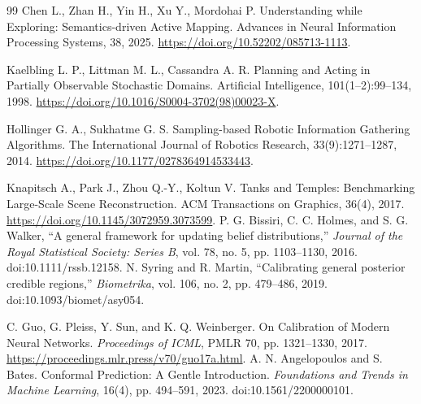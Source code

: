 \documentclass[11pt,a4paper]{article}
\begin{document}
\begin{thebibliography}{99}
 Chen L., Zhan H., Yin H., Xu Y., Mordohai P. Understanding while Exploring: Semantics-driven Active Mapping. Advances in Neural Information Processing Systems, 38, 2025. \url{https://doi.org/10.52202/085713-1113}.

 Kaelbling L. P., Littman M. L., Cassandra A. R. Planning and Acting in Partially Observable Stochastic Domains. Artificial Intelligence, 101(1--2):99--134, 1998. \url{https://doi.org/10.1016/S0004-3702(98)00023-X}.

 Hollinger G. A., Sukhatme G. S. Sampling-based Robotic Information Gathering Algorithms. The International Journal of Robotics Research, 33(9):1271--1287, 2014. \url{https://doi.org/10.1177/0278364914533443}.

 Knapitsch A., Park J., Zhou Q.-Y., Koltun V. Tanks and Temples: Benchmarking Large-Scale Scene Reconstruction. ACM Transactions on Graphics, 36(4), 2017. \url{https://doi.org/10.1145/3072959.3073599}.
 P. G. Bissiri, C. C. Holmes, and S. G. Walker,
``A general framework for updating belief distributions,''
\emph{Journal of the Royal Statistical Society: Series B}, vol. 78,
no. 5, pp. 1103--1130, 2016. doi:10.1111/rssb.12158.
 N. Syring and R. Martin,
``Calibrating general posterior credible regions,''
\emph{Biometrika}, vol. 106, no. 2, pp. 479--486, 2019.
doi:10.1093/biomet/asy054.


 C. Guo, G. Pleiss, Y. Sun, and K. Q. Weinberger.
On Calibration of Modern Neural Networks. \emph{Proceedings of ICML},
PMLR 70, pp. 1321--1330, 2017. \url{https://proceedings.mlr.press/v70/guo17a.html}.
 A. N. Angelopoulos and S. Bates.
Conformal Prediction: A Gentle Introduction. \emph{Foundations and Trends in Machine Learning},
16(4), pp. 494--591, 2023. doi:10.1561/2200000101.

\end{thebibliography}
\end{document}
